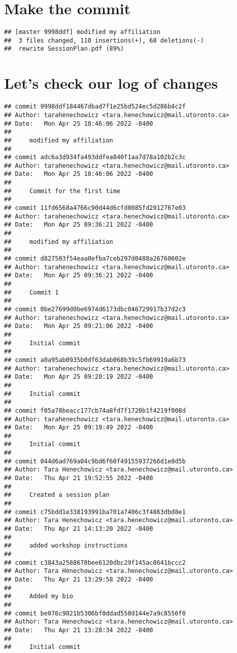 \documentclass[]{article}
\begin{document}
\section{Make the commit}\label{make-the-commit}

\begin{verbatim}
## [master 9998ddf] modified my affiliation
##  3 files changed, 110 insertions(+), 68 deletions(-)
##  rewrite SessionPlan.pdf (89%)
\end{verbatim}

\section{Let's check our log of
changes}\label{lets-check-our-log-of-changes}

\begin{verbatim}
## commit 9998ddf184467dbad7f1e25bd524ec5d286b4c2f
## Author: tarahenechowicz <tara.henechowicz@mail.utoronto.ca>
## Date:   Mon Apr 25 10:46:06 2022 -0400
## 
##     modified my affiliation
## 
## commit adc6a3d934fa493ddfea840f1aa7d78a102b2c3c
## Author: tarahenechowicz <tara.henechowicz@mail.utoronto.ca>
## Date:   Mon Apr 25 10:46:06 2022 -0400
## 
##     Commit for the first time
## 
## commit 11fd6568a4766c90d44d6cfd8085fd2912767e03
## Author: tarahenechowicz <tara.henechowicz@mail.utoronto.ca>
## Date:   Mon Apr 25 09:36:21 2022 -0400
## 
##     modified my affiliation
## 
## commit d827503f54eaa0efba7ceb297d0488a26760602e
## Author: tarahenechowicz <tara.henechowicz@mail.utoronto.ca>
## Date:   Mon Apr 25 09:36:21 2022 -0400
## 
##     Commit 1
## 
## commit 0be27699d0be6974d6173dbc046729917b37d2c3
## Author: tarahenechowicz <tara.henechowicz@mail.utoronto.ca>
## Date:   Mon Apr 25 09:21:06 2022 -0400
## 
##     Initial commit
## 
## commit a0a95ab0935b0df63dab068b39c5fb69919a6b73
## Author: tarahenechowicz <tara.henechowicz@mail.utoronto.ca>
## Date:   Mon Apr 25 09:20:19 2022 -0400
## 
##     Initial commit
## 
## commit f05a78beacc177cb74a8fd7f1720b1f4219f008d
## Author: tarahenechowicz <tara.henechowicz@mail.utoronto.ca>
## Date:   Mon Apr 25 09:19:49 2022 -0400
## 
##     Initial commit
## 
## commit 044d6ad769a04c9bd6f60f49155937266d1e8d5b
## Author: Tara Henechowicz <tara.henechowicz@mail.utoronto.ca>
## Date:   Thu Apr 21 19:52:55 2022 -0400
## 
##     Created a session plan
## 
## commit c75bdd1e338193991ba701a7406c3f4863dbd8e1
## Author: Tara Henechowicz <tara.henechowicz@mail.utoronto.ca>
## Date:   Thu Apr 21 14:13:20 2022 -0400
## 
##     added workshop instructions
## 
## commit c3843a2588678bee6120dbc29f145ac8641bccc2
## Author: Tara Henechowicz <tara.henechowicz@mail.utoronto.ca>
## Date:   Thu Apr 21 13:29:58 2022 -0400
## 
##     Added my bio
## 
## commit be076c9021b5306bf0ddad550d144e7a9c8556f0
## Author: Tara Henechowicz <tara.henechowicz@mail.utoronto.ca>
## Date:   Thu Apr 21 13:28:34 2022 -0400
## 
##     Initial commit
\end{verbatim}
\end{document}
